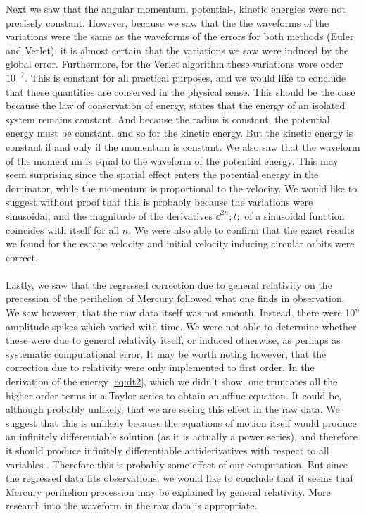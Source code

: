 \documentclass[11pt,english,a4paper]{article}
\begin{document}
Next we saw that the angular momentum, potential-, kinetic energies were not precisely constant. However, because we saw that the the waveforms of the variations were the same as the waveforms of the errors for both methods (Euler and Verlet), it is almost certain that the variations we saw were induced by the global error. Furthermore, for the Verlet algorithm these variations were order $10^{-7}$. This is constant for all practical purposes, and we would like to conclude that these quantities are conserved in the physical sense. This should be the case because the law of conservation of energy, states that the energy of an isolated system remains constant. And because the radius is constant, the potential energy must be constant, and so for the kinetic energy. But the kinetic energy is constant if and only if the momentum is constant. We also saw that the waveform of the momentum is equal to the waveform of the potential energy. This may seem surprising since the spatial effect enters the potential energy in the dominator, while the momentum is proportional to the velocity. We would like to suggest without proof that this is probably because the variations were sinusoidal, and the magnitude of the derivatives $\dd^{2n};t;$ of a sinusoidal function coincides with itself for all $n$. We were also able to confirm that the exact results we found for the escape velocity and initial velocity inducing circular orbits were correct.\\
\\
Lastly, we saw that the regressed correction due to general relativity on the precession of the perihelion of Mercury followed what one finds in observation. We saw however, that the raw data itself was not smooth. Instead, there were 10'' amplitude spikes which varied with time. We were not able to determine whether these were due to general relativity itself, or induced otherwise, as perhaps as systematic computational error. It may be worth noting however, that the correction due to relativity were only implemented to first order. In the derivation of the energy \eqref{eq:dt2}, which we didn't show, one truncates all the higher order terms in a Taylor series to obtain an affine equation. It could be, although probably unlikely, that we are seeing this effect in the raw data. We suggest that this is unlikely because the equations of motion itself would produce an infinitely differentiable solution (as it is actually a power series), and therefore it should produce infinitely differentiable antiderivatives with respect to all variables \parencite[86]{lindstrom_mathematical_2016}. Therefore this is probably some effect of our computation. But since the regressed data fits observations, we would like to conclude that it seems that Mercury perihelion precession may be explained by general relativity. More research into the waveform in the raw data is appropriate.\\
\end{document}
